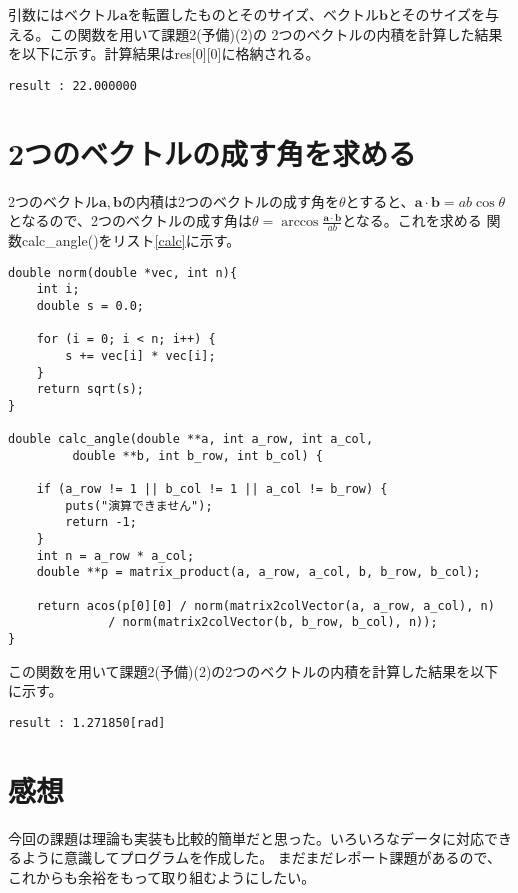 \documentclass{jsarticle}
\begin{document}
	引数にはベクトル$\bm{a}$を転置したものとそのサイズ、ベクトル$\bm{b}$とそのサイズを与える。この関数を用いて課題2(予備)(2)の
	2つのベクトルの内積を計算した結果を以下に示す。計算結果はres[0][0]に格納される。
\begin{verbatim}
result : 22.000000
\end{verbatim}
    \section{2つのベクトルの成す角を求める}
	2つのベクトル$\bm{a}, \bm{b}$の内積は2つのベクトルの成す角を$\theta$とすると、$\bm{a}\cdot \bm{b} = ab\cos\theta$
	となるので、2つのベクトルの成す角は$\displaystyle \theta = \arccos \frac{\bm{a}\cdot \bm{b}}{ab}$となる。これを求める
	関数calc\_angle()をリスト\ref{calc}に示す。
       \begin{lstlisting}[caption=作成した関数scalar\_product(), label=calc]
double norm(double *vec, int n){
	int i;
	double s = 0.0;

	for (i = 0; i < n; i++) {
		s += vec[i] * vec[i];
	}
	return sqrt(s);
}

double calc_angle(double **a, int a_row, int a_col,
		 double **b, int b_row, int b_col) {

	if (a_row != 1 || b_col != 1 || a_col != b_row) {
		puts("演算できません");
		return -1;
	}
	int n = a_row * a_col;
	double **p = matrix_product(a, a_row, a_col, b, b_row, b_col);

	return acos(p[0][0] / norm(matrix2colVector(a, a_row, a_col), n) 
			  / norm(matrix2colVector(b, b_row, b_col), n));
}
	\end{lstlisting}
	この関数を用いて課題2(予備)(2)の2つのベクトルの内積を計算した結果を以下に示す。

\begin{verbatim}
result : 1.271850[rad]
\end{verbatim}
    \section{感想}
	今回の課題は理論も実装も比較的簡単だと思った。いろいろなデータに対応できるように意識してプログラムを作成した。
	まだまだレポート課題があるので、これからも余裕をもって取り組むようにしたい。
       
\end{document}
